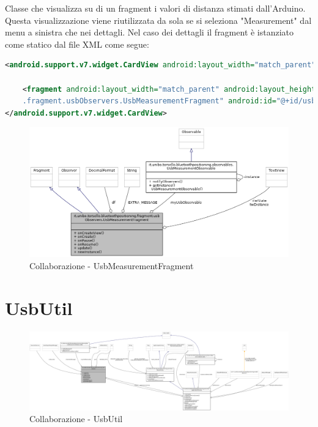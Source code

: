 Classe che visualizza su di un fragment i valori di distanza stimati dall'Arduino. Questa visualizzazione viene riutilizzata da sola se si seleziona "Measurement" dal menu a sinistra che nei dettagli. Nel caso dei dettagli il fragment è istanziato come statico dal file XML come segue:

\begin{lstlisting}[language=XML]
<android.support.v7.widget.CardView android:layout_width="match_parent"	android:layout_height="wrap_content" android:layout_margin="@dimen/card_margin">

	<fragment android:layout_width="match_parent" android:layout_height="wrap_content" android:name="it.unibo.torsello.bluetoothpositioning
	.fragment.usbObservers.UsbMeasurementFragment" android:id="@+id/usbArduino" tools:layout="@layout/fragment_usb_measurement" />
</android.support.v7.widget.CardView>
\end{lstlisting}

\begin{figure}[ph]
	\centering
	\includegraphics[width=1.6\linewidth,angle=90]{img/uml/class/classit_1_1unibo_1_1torsello_1_1bluetoothpositioning_1_1fragment_1_1usbObservers_1_1UsbMeasurementFragment__coll__graph.png}
	\caption{Collaborazione - UsbMeasurementFragment}
\end{figure}

\newpage
\section{UsbUtil}
\begin{figure}[ph]
	\centering
	\includegraphics[width=1.85\linewidth,angle=90]{img/uml/class/classit_1_1unibo_1_1torsello_1_1bluetoothpositioning_1_1util_1_1UsbUtil__coll__graph.png}
	\caption{Collaborazione - UsbUtil}
\end{figure}

